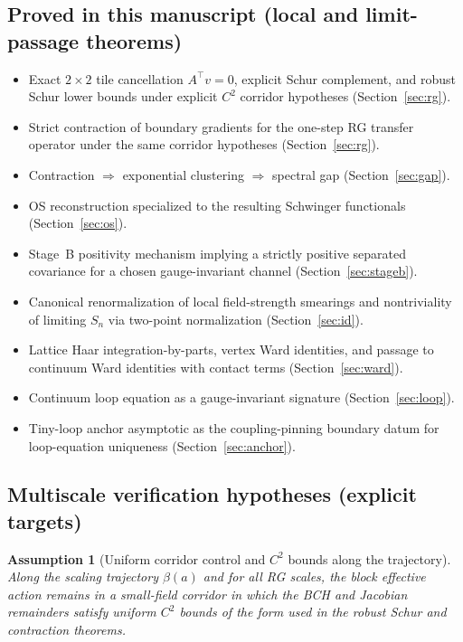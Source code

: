 \documentclass[11pt]{article}
\newtheorem{assumption}[theorem]{Assumption}
\theoremstyle{definition}
\newcommand{\1}{\mathbf{1}}
\begin{document}
\subsection*{Proved in this manuscript (local and limit-passage theorems)}
\begin{itemize}[leftmargin=2em]
\item Exact $2\times2$ tile cancellation $A^\top v=0$, explicit Schur complement, and robust Schur lower bounds under explicit $C^2$ corridor hypotheses (Section~\ref{sec:rg}).
\item Strict contraction of boundary gradients for the one-step RG transfer operator under the same corridor hypotheses (Section~\ref{sec:rg}).
\item Contraction $\Rightarrow$ exponential clustering $\Rightarrow$ spectral gap (Section~\ref{sec:gap}).
\item OS reconstruction specialized to the resulting Schwinger functionals (Section~\ref{sec:os}).
\item Stage~B positivity mechanism implying a strictly positive separated covariance for a chosen gauge-invariant channel (Section~\ref{sec:stageb}).
\item Canonical renormalization of local field-strength smearings and nontriviality of limiting $S_n$ via two-point normalization (Section~\ref{sec:id}).
\item Lattice Haar integration-by-parts, vertex Ward identities, and passage to continuum Ward identities with contact terms (Section~\ref{sec:ward}).
\item Continuum loop equation as a gauge-invariant signature (Section~\ref{sec:loop}).
\item Tiny-loop anchor asymptotic as the coupling-pinning boundary datum for loop-equation uniqueness (Section~\ref{sec:anchor}).
\end{itemize}

\subsection*{Multiscale verification hypotheses (explicit targets)}
\begin{assumption}[Uniform corridor control and $C^2$ bounds along the trajectory]\label{ass:multiscale}
Along the scaling trajectory $\beta(a)$ and for all RG scales, the block effective action remains in a small-field corridor in which the BCH and Jacobian remainders satisfy uniform $C^2$ bounds of the form used in the robust Schur and contraction theorems.
\end{assumption}
\end{document}
